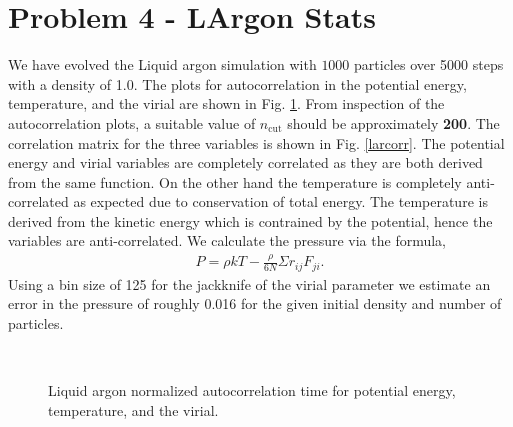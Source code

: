 \documentclass[singlepage,notitlepage,nofootinbib,11pt]{revtex4-1}
\begin{document}
\section{Problem 4 - LArgon Stats}
We have evolved the Liquid argon simulation with $1000$ particles over 5000 steps with a density of 1.0. The plots for autocorrelation in the potential energy, temperature, and the virial are shown in Fig. \ref{lauto}. From inspection of the autocorrelation plots, a suitable value of $n_{\text{cut}}$ should be approximately {\bf 200}. The correlation matrix for the three variables is shown in Fig. \ref{larcorr}. The potential energy and virial variables are completely correlated as they are both derived from the same function. On the other hand the temperature is completely anti-correlated as expected due to conservation of total energy. The temperature is derived from the kinetic energy which is contrained by the potential, hence the variables are anti-correlated. We calculate the pressure via the formula,
\begin{align*}
  P = \rho k T - \frac{\rho}{6 N}\Sigma r_{ij}F_{ji }.
\end{align*}
Using a bin size of 125 for the jackknife of the virial parameter we estimate an error in the pressure of roughly 0.016 for the given initial density and number of particles.
\begin{figure}[h]
\centering
  \captionsetup[subfigure]{labelformat=empty}
  \\
\caption{\label{lauto} Liquid argon normalized autocorrelation time for potential energy, temperature, and the virial.}
\end{figure}
\end{document}
